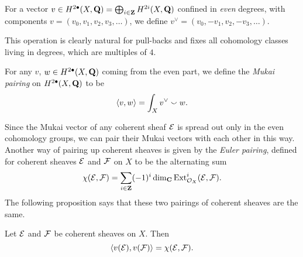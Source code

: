 \begin{definition}
    \label{Definition of v vee}
    For a vector $v \in H^{2\bullet}(X, \mathbf Q) = \bigoplus_{i \in \mathbf Z} H^{2i}(X, \mathbf Q)$ confined in \emph{even} degrees, with components $v = (v_0, v_1, v_2, v_3, \dots)$, we define $v^\vee = (v_0, -v_1, v_2, -v_3, \dots)$.
\end{definition}

This operation is clearly natural for pull-backs and fixes all cohomology classes living in degrees, which are multiples of $4$.  

\begin{definition}
    \label{Definition of Mukai pairing}
    For any $v$, $w \in H^{2\bullet}(X, \mathbf Q)$ coming from the even part, we define the \emph{Mukai pairing} on $H^{2\bullet}(X, \mathbf Q)$ to be
    \[
        \langle v, w \rangle = \int_X v^\vee \smallsmile w.
    \]
\end{definition}

Since the Mukai vector of any coherent sheaf $\mathcal E$ is spread out only in the even cohomology groups, we can pair their Mukai vectors with each other in this way. Another way of pairing up coherent sheaves is given by the \emph{Euler pairing}, defined for coherent sheaves $\mathcal E$ and $\mathcal F$ on $X$ to be the alternating sum
\begin{equation}
    \label{Euler pairing}
    \chi(\mathcal E, \mathcal F) = \sum_{i \in \mathbf Z} (-1)^i \dim_\mathbf C \operatorname{Ext}^i_{\mathcal{O}_{X}}(\mathcal E, \mathcal F).
\end{equation}
The following proposition says that these two pairings of coherent sheaves are the same.

\begin{proposition}
    \label{equler pairing = mukai pairing}
    Let $\mathcal E$ and $\mathcal F$ be coherent sheaves on $X$. Then
    \begin{equation}
        \label{eq: euler pairing = mukai pairing}
        \langle v(\mathcal E), v(\mathcal F) \rangle = \chi(\mathcal E, \mathcal F).
    \end{equation}
\end{proposition}

